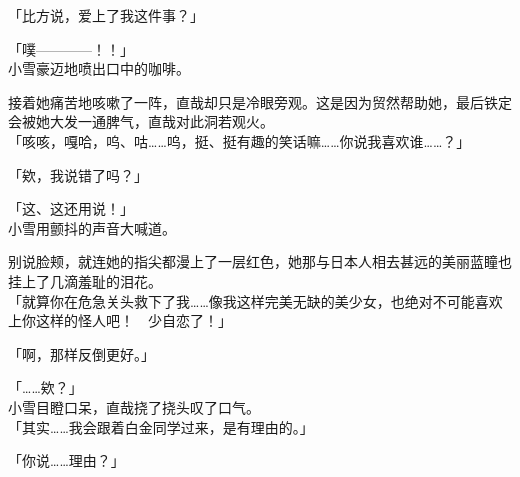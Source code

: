 「比方说，爱上了我这件事？」

 「噗————！！」\\

小雪豪迈地喷出口中的咖啡。

接着她痛苦地咳嗽了一阵，直哉却只是冷眼旁观。这是因为贸然帮助她，最后铁定会被她大发一通脾气，直哉对此洞若观火。\\

「咳咳，嘎哈，呜、咕……呜，挺、挺有趣的笑话嘛……你说我喜欢谁……？」

「欸，我说错了吗？」

「这、这还用说！」\\

小雪用颤抖的声音大喊道。

别说脸颊，就连她的指尖都漫上了一层红色，她那与日本人相去甚远的美丽蓝瞳也挂上了几滴羞耻的泪花。\\

「就算你在危急关头救下了我……像我这样完美无缺的美少女，也绝对不可能喜欢上你这样的怪人吧！　少自恋了！」

「啊，那样反倒更好。」

「……欸？」\\

小雪目瞪口呆，直哉挠了挠头叹了口气。\\

「其实……我会跟着白金同学过来，是有理由的。」

「你说……理由？」

